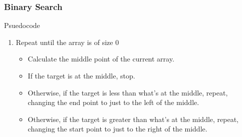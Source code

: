 \documentclass[11pt]{beamer}
\begin{document}
\begin{frame}
	\frametitle{Binary Search}
	\begin{block}{Psuedocode}
	\begin{enumerate}
		\item Repeat until the array is of size 0
		\begin{itemize}
			\item Calculate the middle point of the current array.
			\item If the target is at the middle, stop.
			\item Otherwise, if the target is less than what’s at the middle, repeat, changing the end
			point to just to the left of the middle.
			\item Otherwise, if the target is greater than what’s at the middle, repeat, changing the start point to just to the right of the middle.
		\end{itemize}
	\end{enumerate}	
\end{block}
\end{frame}
\end{document}
